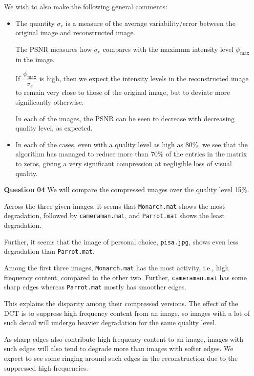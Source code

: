 \documentclass{article}[a4paper]
\begin{document}
	We wish to also make the following general comments:
	\begin{itemize}
		\item The quantity $\sigma_e$ is a measure of the average variability/error between the original image and reconstructed image.
		
		The PSNR measures how $\sigma_e$ compares with the maximum intensity level $\psi_\text{max}$ in the image.
		
		If $\dfrac{\psi_\text{max}}{\sigma_e}$ is high, then we expect the intensity levels in the reconstructed image to remain very close to those of the original image, but to deviate more significantly otherwise.
		
		In each of the images, the PSNR can be seen to decrease with decreasing quality level, as expected.
		
		\item In each of the cases, even with a quality level as high as 80\%, we see that the algorithm has managed to reduce more than 70\% of the entries in the matrix to zeros, giving a very significant compression at negligible loss of visual quality.
	\end{itemize}
	
	\newpage
	
	\textbf{Question 04} We will compare the compressed images over the quality level 15\%.
	
	Across the three given images, it seems that \texttt{Monarch.mat} shows the most degradation, followed by \sloppy\texttt{cameraman.mat}, and \texttt{Parrot.mat} shows the least degradation.
	
	Further, it seems that the image of personal choice, \texttt{pisa.jpg}, shows even less degradation than \texttt{Parrot.mat}.
	
	Among the first three images, \texttt{Monarch.mat} has the most activity, i.e., high frequency content, compared to the other two. Further, \texttt{cameraman.mat} has some sharp edges whereas \texttt{Parrot.mat} mostly has smoother edges.
	
	This explains the disparity among their compressed versions. The effect of the DCT is to suppress high frequency content from an image, so images with a lot of such detail will undergo heavier degradation for the same quality level.
	
	As sharp edges also contribute high frequency content to an image, images with such edges will also tend to degrade more than images with softer edges. We expect to see some ringing around such edges in the reconstruction due to the suppressed high frequencies.
	
\end{document}
